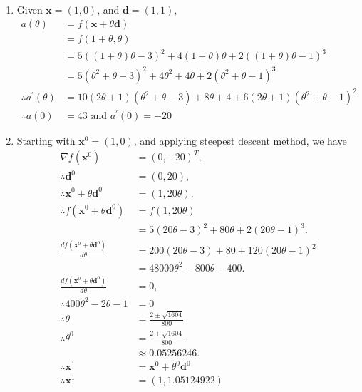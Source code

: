\documentclass[a4paper,11pt]{article}
\newcommand{\ds}{\displaystyle}
\begin{document}
{{\begin{enumerate}[leftmargin=*]
\begin{enumerate}[label=\alph*)]
				\item Given $\ds{\mathbf{x} = (1,0)}$, and $\ds{\mathbf{d} = (1,1)}$, 
					\begin{align*}
						a(\theta) & = f(\mathbf{x} + \theta\mathbf{d}) \\
								  & = f(1+\theta, \theta) \\
								  & = 5((1+\theta)\theta - 3)^2 + 4(1+\theta)\theta + 2((1+\theta)\theta - 1)^3 \\
								  & = 5\left(\theta^2 + \theta - 3\right)^2 + 4\theta^2 + 4\theta + 2\left(\theta^2 + \theta - 1\right)^3 \\
						\therefore a^{\prime}(\theta) & = 10(2\theta+1)\left(\theta^2 + \theta - 3\right) + 8\theta + 4 + 6 (2\theta+1)\left(\theta^2+\theta-1\right)^2 \\
						\therefore a(0) & = 43 \text{ and } a^{\prime}(0)  = -20
					\end{align*}

				\item Starting with $\ds{\mathbf{x}^0 = (1,0)}$, and applying steepest descent method, we have 
					\begin{align*}
						\nabla f(\mathbf{x}^0) & = (0, -20)^T, \\
						\therefore \mathbf{d}^0 & = (0, 20), \\
						\therefore \mathbf{x}^0 + \theta\mathbf{d}^0 & = (1, 20\theta). \\
						\therefore f\left(\mathbf{x}^0 + \theta\mathbf{d}^0\right) & = f(1,20\theta)\\
																				   & = 5(20\theta -3)^2 + 80\theta + 2(20\theta - 1)^3. \\
						\frac{df\left(\mathbf{x}^0 + \theta\mathbf{d}^0\right)}{d\theta} & = 200(20\theta-3) + 80 + 120(20\theta -1)^2 \\
																						 & = 48000\theta^2 - 800\theta - 400.\\
						\frac{df\left(\mathbf{x}^0 + \theta\mathbf{d}^0\right)}{d\theta} & = 0, \\
						\therefore 400\theta^2 -2\theta -1 & = 0 \\
						\therefore \theta & = \frac{2\pm\sqrt{1604}}{800} \\
						\therefore \theta^0 & = \frac{2 + \sqrt{1604}}{800} \\
										  & \approx 0.05256246. \\
						\therefore \mathbf{x}^1 & = \mathbf{x}^0 + \theta^0\mathbf{d}^0 \\
						\therefore \mathbf{x}^1 & = (1, 1.05124922) 
					\end{align*}
			\end{enumerate}


\end{enumerate}}}
\end{document}
